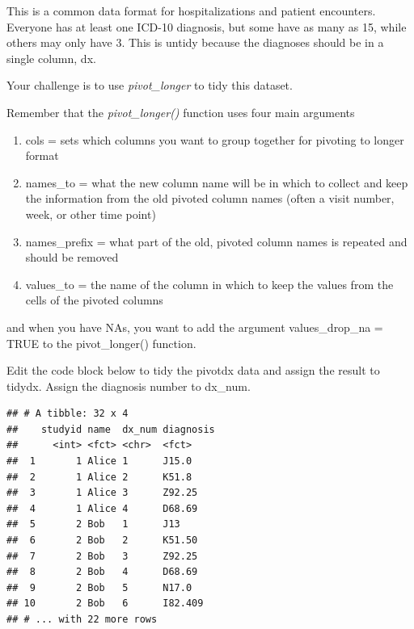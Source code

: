 \documentclass[
]{book}
\newenvironment{Shaded}{\begin{snugshade}}{\end{snugshade}}
\newcommand{\DataTypeTok}[1]{\textcolor[rgb]{0.13,0.29,0.53}{#1}}
\newcommand{\KeywordTok}[1]{\textcolor[rgb]{0.13,0.29,0.53}{\textbf{#1}}}
\newcommand{\NormalTok}[1]{#1}
\newcommand{\OperatorTok}[1]{\textcolor[rgb]{0.81,0.36,0.00}{\textbf{#1}}}
\newcommand{\OtherTok}[1]{\textcolor[rgb]{0.56,0.35,0.01}{#1}}
\newcommand{\StringTok}[1]{\textcolor[rgb]{0.31,0.60,0.02}{#1}}
\providecommand{\tightlist}{%
  \setlength{\itemsep}{0pt}\setlength{\parskip}{0pt}}
\begin{document}
This is a common data format for hospitalizations and patient encounters.
Everyone has at least one ICD-10 diagnosis, but some have as many as 15, while others may only have 3.
This is untidy because the diagnoses should be in a single column, dx.

Your challenge is to use \emph{pivot\_longer} to tidy this dataset.

Remember that the \emph{pivot\_longer()} function uses four main arguments

\begin{enumerate}
\def\labelenumi{\arabic{enumi}.}
\tightlist
\item
  cols = sets which columns you want to group together for pivoting to longer format
\item
  names\_to = what the new column name will be in which to collect and keep the information from the old pivoted column names (often a visit number, week, or other time point)
\item
  names\_prefix = what part of the old, pivoted column names is repeated and should be removed
\item
  values\_to = the name of the column in which to keep the values from the cells of the pivoted columns
\end{enumerate}

and when you have NAs, you want to add the argument
values\_drop\_na = TRUE
to the pivot\_longer() function.

Edit the code block below to tidy the pivotdx data and assign the result to tidydx.
Assign the diagnosis number to dx\_num.

\begin{Shaded}
\end{Shaded}

\begin{verbatim}
## # A tibble: 32 x 4
##    studyid name  dx_num diagnosis
##      <int> <fct> <chr>  <fct>    
##  1       1 Alice 1      J15.0    
##  2       1 Alice 2      K51.8    
##  3       1 Alice 3      Z92.25   
##  4       1 Alice 4      D68.69   
##  5       2 Bob   1      J13      
##  6       2 Bob   2      K51.50   
##  7       2 Bob   3      Z92.25   
##  8       2 Bob   4      D68.69   
##  9       2 Bob   5      N17.0    
## 10       2 Bob   6      I82.409  
## # ... with 22 more rows
\end{verbatim}
\end{document}
